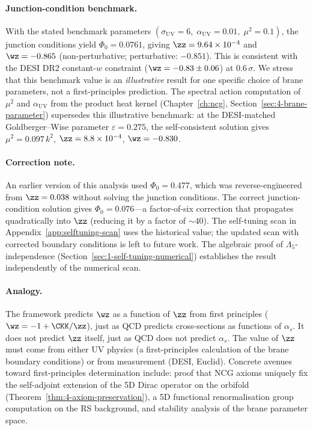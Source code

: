 \paragraph{Junction-condition benchmark.} With the stated benchmark parameters $(\sigma_\mathrm{UV} = 6,\; \alpha_\mathrm{UV} = 0.01,\; \mu^2 = 0.1)$, the junction conditions yield $\Phi_0 = 0.0761$, giving $\zz = 9.64 \times 10^{-4}$ and $\wz = -0.865$ (non-perturbative; perturbative: $-0.851$). This is consistent with the DESI DR2 constant-$w$ constraint ($\wz = -0.83 \pm 0.06$) at $0.6\,\sigma$. We stress that this benchmark value is an \emph{illustrative} result for one specific choice of brane parameters, not a first-principles prediction. The spectral action computation of $\mu^2$ and $\alpha_{\mathrm{UV}}$ from the product heat kernel (Chapter~\ref{ch:ncg}, Section~\ref{sec:4-brane-parameter}) supersedes this illustrative benchmark: at the DESI-matched Goldberger--Wise parameter $\varepsilon = 0.275$, the self-consistent solution gives $\mu^2 = 0.097\,k^2$, $\zz = 8.8 \times 10^{-4}$, $\wz = -0.830$.

\paragraph{Correction note.} An earlier version of this analysis used $\Phi_0 = 0.477$, which was reverse-engineered from $\zz = 0.038$ without solving the junction conditions. The correct junction-condition solution gives $\Phi_0 = 0.076$---a factor-of-six correction that propagates quadratically into $\zz$ (reducing it by a factor of ${\sim}40$). The self-tuning scan in Appendix~\ref{app:selftuning-scan} uses the historical value; the updated scan with corrected boundary conditions is left to future work. The algebraic proof of $\Lambda_5$-independence (Section~\ref{sec:1-self-tuning-numerical}) establishes the result independently of the numerical scan.

\paragraph{Analogy.} The framework predicts $\wz$ as a function of $\zz$ from first principles ($\wz = -1 + \CKK/\zz$), just as QCD predicts cross-sections as functions of $\alpha_s$. It does not predict $\zz$ itself, just as QCD does not predict $\alpha_s$. The value of $\zz$ must come from either UV physics (a first-principles calculation of the brane boundary conditions) or from measurement (DESI, Euclid). Concrete avenues toward first-principles determination include: proof that NCG axioms uniquely fix the self-adjoint extension of the 5D Dirac operator on the orbifold (Theorem~\ref{thm:4-axiom-preservation}), a 5D functional renormalisation group computation on the RS background, and stability analysis of the brane parameter space.

